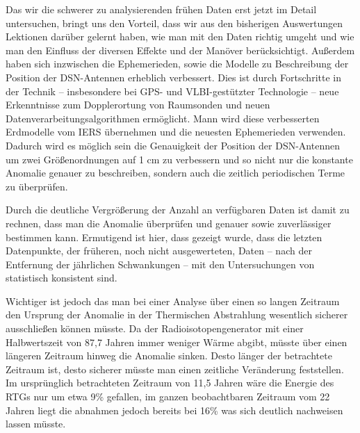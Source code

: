 Das wir die schwerer zu analysierenden frühen Daten erst jetzt im Detail untersuchen, bringt uns den Vorteil, dass wir aus den bisherigen Auswertungen Lektionen darüber gelernt haben, wie man mit den Daten richtig umgeht und wie man den Einfluss der diversen Effekte und der Manöver berücksichtigt.\cite{Nieto2005}
Außerdem haben sich inzwischen die Ephemerieden, sowie die Modelle zu Beschreibung der Position der DSN-Antennen erheblich verbessert. Dies ist durch Fortschritte in der Technik – insbesondere bei GPS- und VLBI-gestützter Technologie – neue Erkenntnisse zum Dopplerortung von Raumsonden und neuen Datenverarbeitungsalgorithmen ermöglicht.
Mann wird diese verbesserten Erdmodelle vom IERS übernehmen und die neuesten Ephemerieden verwenden. Dadurch wird es möglich sein die Genauigkeit der Position der DSN-Antennen um zwei Größenordnungen auf 1 cm zu verbessern und so nicht nur die konstante Anomalie genauer zu beschreiben, sondern auch die zeitlich periodischen Terme zu überprüfen.\cite{Turyshev2004}

Durch die deutliche Vergrößerung der Anzahl an verfügbaren Daten ist damit zu rechnen, dass man die Anomalie überprüfen und genauer sowie zuverlässiger bestimmen kann.
Ermutigend ist hier, dass gezeigt wurde, dass die letzten Datenpunkte, der früheren, noch nicht ausgewerteten, Daten – nach der Entfernung der jährlichen Schwankungen – mit den Untersuchungen von \cite{Anderson2002} statistisch konsistent sind.\cite{Nieto2005}

Wichtiger ist jedoch das man bei einer Analyse über einen so langen Zeitraum den Ursprung der Anomalie in der Thermischen Abstrahlung wesentlich sicherer ausschließen können müsste. Da der Radioisotopengenerator mit einer Halbwertszeit von 87,7 Jahren immer weniger Wärme abgibt, müsste über einen längeren Zeitraum hinweg die Anomalie sinken. Desto länger der betrachtete Zeitraum ist, desto sicherer müsste man einen zeitliche Veränderung feststellen.
Im ursprünglich betrachteten Zeitraum von 11,5 Jahren wäre die Energie des RTGs nur um etwa 9\% gefallen, im ganzen beobachtbaren Zeitraum vom 22 Jahren liegt die abnahmen jedoch bereits bei 16\% was sich deutlich nachweisen lassen müsste.

